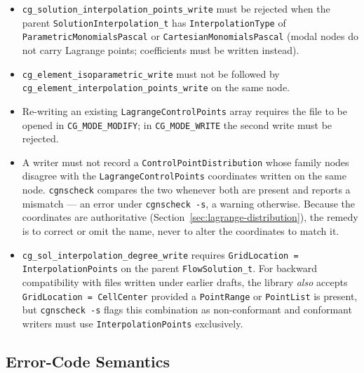 \documentclass[11pt,letterpaper]{article}
\begin{document}
{\sloppy
\begin{itemize}
  \item \texttt{cg\_solution\_interpolation\_points\_write} must be rejected when the
    parent \texttt{SolutionInterpolation\_t} has \texttt{InterpolationType} of
    \texttt{ParametricMonomialsPascal} or \texttt{CartesianMonomialsPascal} (modal nodes do not
    carry Lagrange points; coefficients must be written instead).
  \item \texttt{cg\_element\_isoparametric\_write} must not be followed by
    \texttt{cg\_element\_interpolation\_points\_write} on the same node.
  \item Re-writing an existing \texttt{LagrangeControlPoints}
    array requires the file to be opened in \texttt{CG\_MODE\_MODIFY}; in
    \texttt{CG\_MODE\_WRITE} the second write must be rejected.
  \item A writer must not record a \texttt{ControlPointDistribution} whose family
    nodes disagree with the \texttt{LagrangeControlPoints} coordinates written on the same
    node.  \texttt{cgnscheck} compares the two whenever both are present and reports a
    mismatch --- an error under \texttt{cgnscheck -s}, a warning otherwise.  Because the
    coordinates are authoritative (Section~\ref{sec:lagrange-distribution}), the remedy is to
    correct or omit the name, never to alter the coordinates to match it.
  \item \texttt{cg\_sol\_interpolation\_degree\_write} requires
    \texttt{GridLocation = InterpolationPoints} on the parent \texttt{FlowSolution\_t}.
    For backward compatibility with files written under earlier drafts, the library
    \emph{also} accepts \texttt{GridLocation = CellCenter} provided a
    \texttt{PointRange} or \texttt{PointList} is present, but \texttt{cgnscheck -s}
    flags this combination as non-conformant and conformant writers must use
    \texttt{InterpolationPoints} exclusively.
\end{itemize}
\par}

\subsection{Error-Code Semantics}
\end{document}
